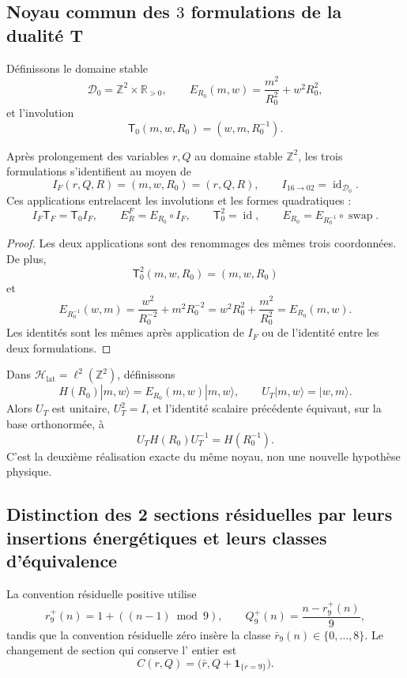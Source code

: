 \subsection{Noyau commun des \(3\) formulations de la dualité T}

Définissons le domaine stable
\[
 \mathscr D_0=\mathbb Z^2\times\mathbb R_{>0},
 \qquad
 E_{R_0}(m,w)=\frac{m^2}{R_0^2}+w^2R_0^2,
\]
et l'involution
\[
 \mathsf T_0(m,w,R_0)=(w,m,R_0^{-1}).
\]

\begin{theorem}
\label{thm:cierre-vtm-tres-formulaciones-t}
Après prolongement des variables \(r,Q\) au domaine stable
\(\mathbb Z^2\), les trois formulations s'identifient au moyen de
\[
 I_F(r,Q,R)=(m,w,R_0)=(r,Q,R),
 \qquad I_{16\to02}=\operatorname{id}_{\mathscr D_0}.
\]
Ces applications entrelacent les involutions et les formes quadratiques :
\[
 I_F\mathsf T_F=\mathsf T_0I_F,
 \qquad
 E_R^F=E_{R_0}\circ I_F,
 \qquad
 \mathsf T_0^2=\operatorname{id},
 \qquad
 E_{R_0}=E_{R_0^{-1}}\circ\operatorname{swap}.
\]
\end{theorem}

\begin{proof}
Les deux applications sont des renommages des mêmes trois coordonnées. De plus,
\[
 \mathsf T_0^2(m,w,R_0)=(m,w,R_0)
\]
et
\[
 E_{R_0^{-1}}(w,m)
 =\frac{w^2}{R_0^{-2}}+m^2R_0^{-2}
 =w^2R_0^2+\frac{m^2}{R_0^2}
 =E_{R_0}(m,w).
\]
Les identités sont les mêmes après application de \(I_F\) ou de l'identité entre les
deux formulations.
\end{proof}

Dans \(\mathcal H_{\mathrm{lat}}=\ell^2(\mathbb Z^2)\), définissons
\[
 H(R_0)|m,w\rangle=E_{R_0}(m,w)|m,w\rangle,
 \qquad U_T|m,w\rangle=|w,m\rangle.
\]
Alors \(U_T\) est unitaire, \(U_T^2=I\), et l'identité scalaire précédente
équivaut, sur la base orthonormée, à
\[
 \boxed{U_TH(R_0)U_T^{-1}=H(R_0^{-1}).}
\]
C'est la deuxième réalisation exacte du même noyau, non une nouvelle
hypothèse physique.

\subsection{Distinction des 2 sections résiduelles par leurs insertions énergétiques et leurs classes d'équivalence}

La convention résiduelle positive utilise
\[
 r_9^+(n)=1+((n-1)\bmod9),
 \qquad Q_9^+(n)=\frac{n-r_9^+(n)}9,
\]
tandis que la convention résiduelle zéro insère la classe
\(\bar r_9(n)\in\{0,\ldots,8\}\). Le changement de section qui conserve l'
entier est
\[
 C(r,Q)=\bigl(\bar r,Q+\mathbf1_{\{r=9\}}\bigr).
\]

